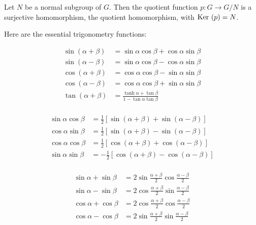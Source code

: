 \begin{theorem}
    Let $N$ be a normal subgroup of $G$. Then the quotient function $p: G \rightarrow G/N$ is a surjective homomorphism, the quotient homomorphism, with $\displaystyle \mathrm{Ker}~( p ) = N$.
\end{theorem}



\begin{theorem} 
    Here are the essential trigonometry functions:    
    
\begin{equation}
    \begin{aligned}
        \sin(\alpha + \beta) &=\sin\alpha\cos\beta + \cos\alpha\sin\beta \\
        \sin(\alpha - \beta) &=\sin\alpha\cos\beta - \cos\alpha\sin\beta \\
        \cos(\alpha + \beta) &=\cos\alpha\cos\beta - \sin\alpha\sin\beta \\
        \cos(\alpha - \beta) &=\cos\alpha\cos\beta + \sin\alpha\sin\beta \\
        \tan(\alpha+\beta) &= \frac{\tanh\alpha + \tan\beta}{1 - \tan\alpha \tan\beta} \\   
    \end{aligned}
\end{equation}


\begin{equation}
    \begin{aligned}
        \sin\alpha\cos\beta &=\frac{1}{2}[\sin(\alpha+\beta) + \sin(\alpha - \beta)] \\
        \cos\alpha\sin\beta &=\frac{1}{2}[\sin(\alpha+\beta) - \sin(\alpha - \beta)] \\
        \cos\alpha\cos\beta &=\frac{1}{2}[\cos(\alpha + \beta) + \cos(\alpha - \beta)] \\
        \sin\alpha\sin\beta &=-\frac{1}{2}[\cos(\alpha + \beta) - \cos(\alpha - \beta)] \\
    \end{aligned}
\end{equation}


\begin{equation}
    \begin{aligned}   
        \sin\alpha + \sin\beta &= 2 \sin\frac{\alpha+\beta}{2}\cos\frac{\alpha-\beta}{2} \\
        \sin\alpha - \sin\beta &= 2 \cos\frac{\alpha+\beta}{2}\sin\frac{\alpha-\beta}{2} \\
        \cos\alpha + \cos\beta &= 2 \cos\frac{\alpha+\beta}{2}\cos\frac{\alpha-\beta}{2} \\
        \cos\alpha - \cos\beta &= 2 \sin\frac{\alpha+\beta}{2}\sin\frac{\alpha-\beta}{2} \\ 
    \end{aligned}
\end{equation}



\end{theorem}
